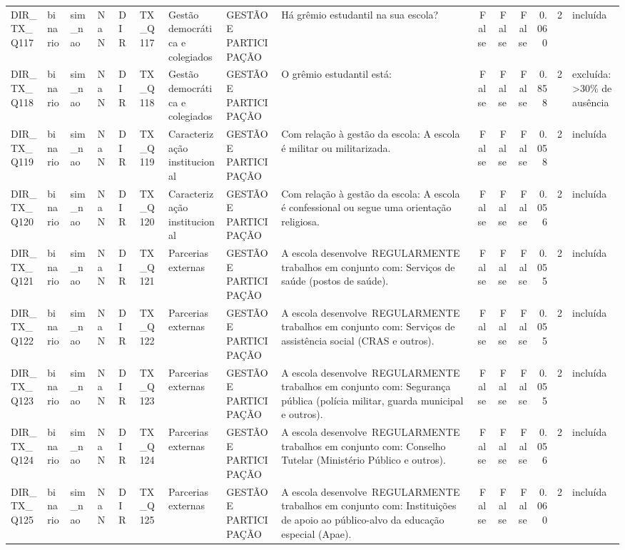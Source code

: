 \begin{tabular}{lllllllllrrrrrl}
DIR\_TX\_Q117 & binario & sim\_nao & NaN & DIR & TX\_Q117 & Gestão democrática e colegiados & GESTÃO E PARTICIPAÇÃO & Há grêmio estudantil na sua escola? & False & False & False & 0.060 & 2 & incluída \\
DIR\_TX\_Q118 & binario & sim\_nao & NaN & DIR & TX\_Q118 & Gestão democrática e colegiados & GESTÃO E PARTICIPAÇÃO & O grêmio estudantil está: & False & False & False & 0.858 & 2 & excluída: >30\% de ausência \\
DIR\_TX\_Q119 & binario & sim\_nao & NaN & DIR & TX\_Q119 & Caracterização institucional & GESTÃO E PARTICIPAÇÃO & Com relação à gestão da escola: A escola é militar ou militarizada. & False & False & False & 0.058 & 2 & incluída \\
DIR\_TX\_Q120 & binario & sim\_nao & NaN & DIR & TX\_Q120 & Caracterização institucional & GESTÃO E PARTICIPAÇÃO & Com relação à gestão da escola: A escola é confessional ou segue uma orientação religiosa. & False & False & False & 0.056 & 2 & incluída \\
DIR\_TX\_Q121 & binario & sim\_nao & NaN & DIR & TX\_Q121 & Parcerias externas & GESTÃO E PARTICIPAÇÃO & A escola desenvolve REGULARMENTE trabalhos em conjunto com: Serviços de saúde (postos de saúde). & False & False & False & 0.055 & 2 & incluída \\
DIR\_TX\_Q122 & binario & sim\_nao & NaN & DIR & TX\_Q122 & Parcerias externas & GESTÃO E PARTICIPAÇÃO & A escola desenvolve REGULARMENTE trabalhos em conjunto com: Serviços de assistência social (CRAS e outros). & False & False & False & 0.055 & 2 & incluída \\
DIR\_TX\_Q123 & binario & sim\_nao & NaN & DIR & TX\_Q123 & Parcerias externas & GESTÃO E PARTICIPAÇÃO & A escola desenvolve REGULARMENTE trabalhos em conjunto com: Segurança pública (polícia militar, guarda municipal e outros). & False & False & False & 0.055 & 2 & incluída \\
DIR\_TX\_Q124 & binario & sim\_nao & NaN & DIR & TX\_Q124 & Parcerias externas & GESTÃO E PARTICIPAÇÃO & A escola desenvolve REGULARMENTE trabalhos em conjunto com: Conselho Tutelar (Ministério Público e outros). & False & False & False & 0.056 & 2 & incluída \\
DIR\_TX\_Q125 & binario & sim\_nao & NaN & DIR & TX\_Q125 & Parcerias externas & GESTÃO E PARTICIPAÇÃO & A escola desenvolve REGULARMENTE trabalhos em conjunto com: Instituições de apoio ao público-alvo da educação especial (Apae). & False & False & False & 0.060 & 2 & incluída \\

\end{tabular}

